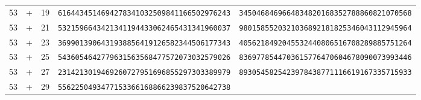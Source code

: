 \begin{longtable}{@{}rcrll@{}}
53&+&19&\texttt{6164434514694278341032509841166502976243}&\texttt{3450468469664834820168352788860821070568}\\
53&+&21&\texttt{5321596643421341194433062465431341960037}&\texttt{9801585520321036892181825346043112945964}\\
53&+&23&\texttt{3699013906431938856419126582344506177343}&\texttt{4056218492045532440806516708289885751264}\\
53&+&25&\texttt{5436054642779631563568477572073032579026}&\texttt{8369778544703615776470604678090073993446}\\
53&+&27&\texttt{2314213019469260727951696855297303389979}&\texttt{8930545825423978438771116619167335715933}\\
53&+&29&\texttt{5562250493477153366168866239837520642738}&\texttt{}\\
\end{longtable}
\endgroup
